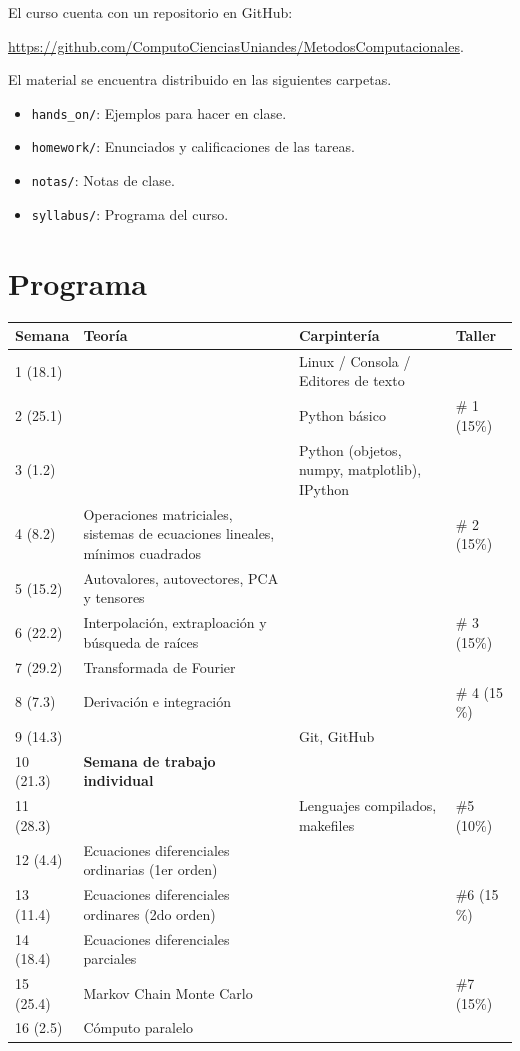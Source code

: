 \documentclass[11pt]{article}
\begin{document}
El curso cuenta con un repositorio en GitHub:

\url{https://github.com/ComputoCienciasUniandes/MetodosComputacionales}. 

El material se
encuentra distribuido en las siguientes carpetas. 


\begin{itemize}
\item \texttt{hands\_on/}: Ejemplos para hacer en clase.
\item \texttt{homework/}: Enunciados y calificaciones de las tareas.
\item \texttt{notas/}: Notas de clase.
\item \texttt{syllabus/}: Programa del curso.

\end{itemize}
 
 

\section*{Programa}

\begin{center}
\renewcommand{\arraystretch}{1.1}
\begin{tabular}{|p{1.6cm}|p{7.0cm}|p{4.0cm}|p{2.5cm}|}
\hline

Semana & Teor\'ia & Carpinter\'ia & Taller \\\hline
1 (18.1) &     & Linux / Consola / Editores de texto & \\\hline
2 (25.1) & 	& Python b\'asico & \# 1 (15\%) \\\hline
3 (1.2) & 	& Python (objetos, numpy, matplotlib), IPython& \\\hline 
4 (8.2) & 	Operaciones matriciales, sistemas de ecuaciones lineales,
m\'inimos cuadrados & &  \# 2 (15\%) \\\hline
5 (15.2) &  Autovalores, autovectores, PCA y tensores& & \\\hline
6 (22.2) &  Interpolaci\'on, extraploaci\'on y b\'usqueda de ra\'ices & & \#
3 (15\%)\\\hline
7 (29.2) &  Transformada de Fourier & & \\ \hline
8 (7.3) & Derivaci\'on e integraci\'on &  & \# 4 (15 \%)\\\hline
9 (14.3) & & Git, GitHub &  \\\hline
10 (21.3) & {\bf Semana de trabajo individual} & &\\\hline
11 (28.3) & & Lenguajes compilados, makefiles & \#5 (10\%) \\\hline
12 (4.4) & Ecuaciones diferenciales ordinarias (1er orden)& & \\\hline 
13 (11.4) & Ecuaciones diferenciales ordinares (2do orden)& & \#6 (15 \%)\\\hline
14 (18.4) & Ecuaciones diferenciales parciales &  & \\\hline
15 (25.4) & Markov Chain Monte Carlo &   & \#7 (15\%) \\\hline
16 (2.5) & C\'omputo paralelo &    & \\\hline
\hline
\end{tabular}
\end{center}
\end{document}
